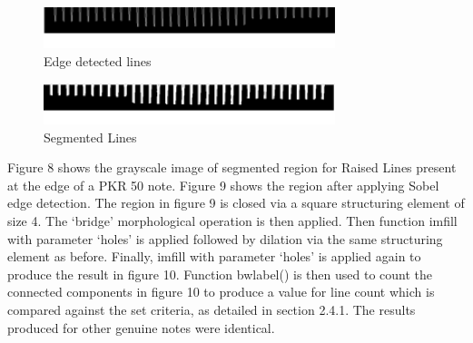 \documentclass{article}
\begin{document}
\begin{figure}[h!]

\begin{minipage}[b]{1.0\linewidth}
  \centering
  \centerline{\includegraphics[width=8.5cm]{lines2.png}}
  \vspace{-3mm}
\end{minipage}
%
\caption{Edge detected lines}
\label{fig:lines2}
\vspace{-3mm}
\end{figure}

\begin{figure}[h!]

\begin{minipage}[b]{1.0\linewidth}
  \centering
  \centerline{\includegraphics[width=8.5cm]{lines3.png}}
  \vspace{-3mm}
\end{minipage}
%
\caption{Segmented Lines}
\label{fig:lines3}
\vspace{-3mm}
\end{figure}

Figure 8 shows the grayscale image of segmented region for Raised Lines present at the edge of a PKR 50 note. Figure 9 shows the region after applying Sobel edge detection. The region in figure 9 is closed via a square structuring element of size 4. The ‘bridge’ morphological operation is then applied. Then function imfill with parameter ‘holes’ is applied followed by dilation via the same structuring element as before. Finally, imfill with parameter ‘holes’ is applied again to produce the result in figure 10. Function bwlabel() is then used to count the connected components in figure 10 to produce a value for line count which is compared against the set criteria, as detailed in section 2.4.1. The results produced for other genuine notes were identical.
\end{document}

